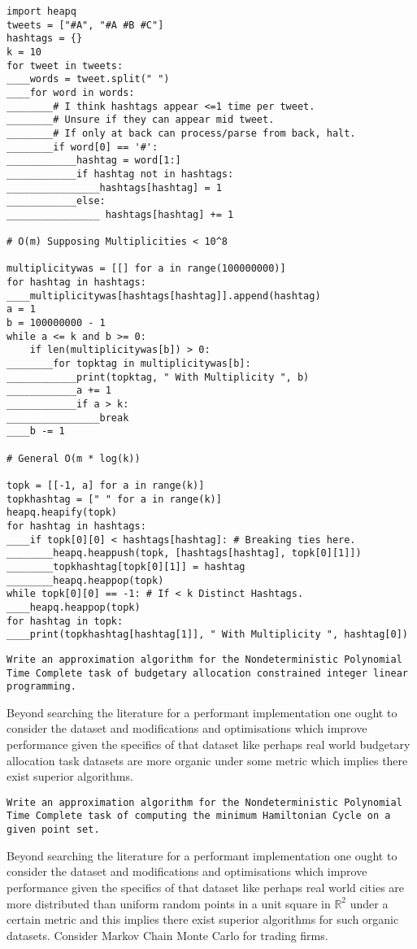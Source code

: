 \begin{verbatim}
import heapq
tweets = ["#A", "#A #B #C"]
hashtags = {}
k = 10
for tweet in tweets:
____words = tweet.split(" ")
____for word in words:
________# I think hashtags appear <=1 time per tweet.
________# Unsure if they can appear mid tweet.
________# If only at back can process/parse from back, halt.
________if word[0] == '#':
____________hashtag = word[1:]
____________if hashtag not in hashtags:
________________hashtags[hashtag] = 1
____________else:
________________ hashtags[hashtag] += 1

# O(m) Supposing Multiplicities < 10^8

multiplicitywas = [[] for a in range(100000000)]
for hashtag in hashtags:
____multiplicitywas[hashtags[hashtag]].append(hashtag)
a = 1
b = 100000000 - 1
while a <= k and b >= 0:
	if len(multiplicitywas[b]) > 0:
________for topktag in multiplicitywas[b]:
____________print(topktag, " With Multiplicity ", b)
____________a += 1
____________if a > k:
________________break
____b -= 1

# General O(m * log(k))

topk = [[-1, a] for a in range(k)]
topkhashtag = [" " for a in range(k)]
heapq.heapify(topk)
for hashtag in hashtags:
____if topk[0][0] < hashtags[hashtag]: # Breaking ties here.
________heapq.heappush(topk, [hashtags[hashtag], topk[0][1]])
________topkhashtag[topk[0][1]] = hashtag
________heapq.heappop(topk)
while topk[0][0] == -1: # If < k Distinct Hashtags.
____heapq.heappop(topk)
for hashtag in topk:
____print(topkhashtag[hashtag[1]], " With Multiplicity ", hashtag[0])
\end{verbatim}

\texttt{Write an approximation algorithm for the Nondeterministic Polynomial Time Complete task of budgetary allocation constrained integer linear programming.}

Beyond searching the literature for a performant implementation one ought to consider the dataset and modifications and optimisations which improve performance given the specifics of that dataset like perhaps real world budgetary allocation task datasets are more organic under some metric which implies there exist superior algorithms.

\texttt{Write an approximation algorithm for the Nondeterministic Polynomial Time Complete task of computing the minimum Hamiltonian Cycle on a given point set.}

Beyond searching the literature for a performant implementation one ought to consider the dataset and modifications and optimisations which improve performance given the specifics of that dataset like perhaps real world cities are more distributed than uniform random points in a unit square in $\mathbb{R}^2$ under a certain metric and this implies there exist superior algorithms for such organic datasets. Consider Markov Chain Monte Carlo for trading firms.

